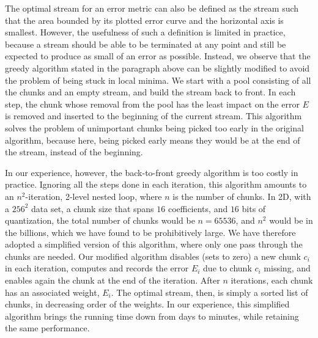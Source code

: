 The optimal stream for an error metric can also be defined as the stream such that the area bounded
by its plotted error curve and the horizontal axis is smallest. However, the usefulness of such a
definition is limited in practice, because a stream should be able to be terminated at any point and
still be expected to produce as small of an error as possible. Instead, we observe that the greedy
algorithm stated in the paragraph above can be slightly modified to avoid the problem of being stuck
in local minima. We start with a pool consisting of all the chunks and an empty stream, and build
the stream back to front. In each step, the chunk whose removal from the pool has the least impact
on the error $E$ is removed and inserted to the beginning of the current stream. This algorithm
solves the problem of unimportant chunks being picked too early in the original algorithm, because
here, being picked early means they would be at the end of the stream, instead of the beginning.

In our experience, however, the back-to-front greedy algorithm is too costly in practice. Ignoring
all the steps done in each iteration, this algorithm amounts to an $n^2$-iteration, 2-level nested
loop, where $n$ is the number of chunks. In 2D, with a $256^2$ data set, a chunk size that spans
$16$ coefficients, and $16$ bits of quantization, the total number of chunks would be $n=65536$, and
$n^2$ would be in the billions, which we have found to be prohibitively large. We have therefore
adopted a simplified version of this algorithm, where only one pass through the chunks are needed.
Our modified algorithm disables (sets to zero) a new chunk $c_i$ in each iteration, computes and
records the error $E_i$ due to chunk $c_i$ missing, and enables again the chunk at the end of the
iteration. After $n$ iterations, each chunk has an associated weight, $E_i$. The optimal stream,
then, is simply a sorted list of chunks, in decreasing order of the weights. In our experience, this
simplified algorithm brings the running time down from days to minutes, while retaining the same
performance.